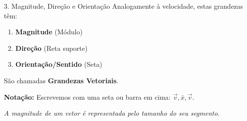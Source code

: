 \documentclass{beamer}
\begin{document}
	\begin{frame}{3. Magnitude, Direção e Orientação}
		Analogamente à velocidade, estas grandezas têm:
		\begin{enumerate}
			\item \textbf{Magnitude} (Módulo)
			\item \textbf{Direção} (Reta suporte)
			\item \textbf{Orientação/Sentido} (Seta)
		\end{enumerate}
		
		São chamadas \textbf{Grandezas Vetoriais}.
		
		\textbf{Notação:}
		Escrevemos com uma seta ou barra em cima: $\vec{v}, \bar{x}, \vec{v}$.
		
		\vspace{0.3cm}
		\textit{A magnitude de um vetor é representada pelo tamanho do seu segmento.}
	\end{frame}
	
\end{document}
